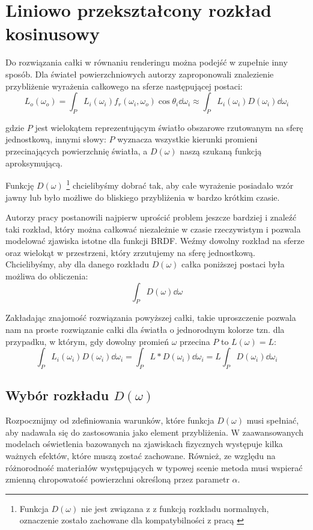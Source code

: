 \documentclass[../main.tex]{subfiles}
\begin{document}
\chapter{Liniowo przekształcony rozkład kosinusowy}
\label{Chapter:LTC}

Do rozwiązania całki w równaniu renderingu można podejść w zupełnie inny sposób. Dla świateł powierzchniowych autorzy \cite{ltc_heitz} zaproponowali znalezienie przybliżenie wyrażenia całkowego na sferze następującej postaci:
\[
L_o(\omega_o) = \int_{P} {
  L_i(\omega_i)
  f_r(\omega_i, \omega_o)
  \cos \theta_i
  \dd \omega_i
}
\approx
\int_{P} {
  L_i(\omega_i)
  D(\omega_i)
  \dd \omega_i
}
\]

\noindent gdzie $P$ jest wielokątem reprezentującym światło obszarowe rzutowanym na sferę jednostkową, innymi słowy: $P$ wyznacza wszystkie kierunki promieni przecinających powierzchnię światła, a $D(\omega)$ naszą szukaną funkcją aproksymującą.

Funkcję $D(\omega)$ \footnote{Funkcja $D(\omega)$ nie jest związana z z funkcją rozkładu normalnych, oznaczenie zostało zachowane dla kompatybilności z pracą \cite{ltc_heitz}} chcielibyśmy dobrać tak, aby całe wyrażenie posiadało wzór jawny lub było możliwe do bliskiego przybliżenia w bardzo krótkim czasie.

Autorzy pracy \cite{ltc_heitz} postanowili najpierw uprościć problem jeszcze bardziej i znaleźć taki rozkład, który można całkować niezależnie w czasie rzeczywistym i pozwala modelować  zjawiska istotne dla funkcji BRDF. Weźmy dowolny rozkład na sferze oraz wielokąt  w przestrzeni, który zrzutujemy na sferę jednostkową. Chcielibyśmy, aby dla danego rozkładu $D(\omega)$ całka poniższej postaci była możliwa do obliczenia:
\[
\int_P {
    D(\omega)
    \dd \omega
}
\]

Zakładając znajomość rozwiązania powyższej całki, takie uproszczenie pozwala nam na proste rozwiązanie całki dla światła o jednorodnym kolorze tzn. dla przypadku, w którym, gdy dowolny promień $\omega$ przecina $P$ to $L(\omega)=L$:
\[
\int_{P} {
    L_i(\omega_i)
    D(\omega_i)
    \dd \omega_i
} = \int_{P} {
    L *
    D(\omega_i)
    \dd \omega_i
} = L \int_{P} {
    D(\omega_i)
    \dd \omega_i
}
\]

\section{Wybór rozkładu $D(\omega)$}

Rozpocznijmy od zdefiniowania warunków, które funkcja $D(\omega)$ musi spełniać, aby nadawała się do zastosowania jako element przybliżenia. W zaawansowanych modelach oświetlenia bazowanych na zjawiskach fizycznych występuje kilka ważnych efektów, które muszą zostać zachowane. Również, ze względu na różnorodność materiałów występujących w typowej scenie metoda musi wspierać zmienną chropowatość powierzchni określoną przez parametr $\alpha$.
\end{document}

